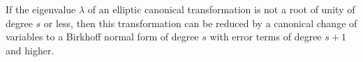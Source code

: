 If the eigenvalue $\lambda$ of an elliptic canonical transformation is not a root of unity of degree $s$ or less, then this transformation can be reduced by a canonical change of variables to a Birkhoff normal form of degree $s$ with error terms of degree $s+1$ and higher.
